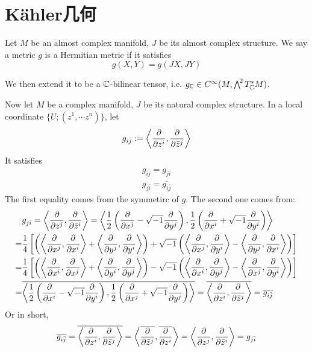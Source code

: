     \section{K\"ahler几何}
    \begin{definition}
        Let $M$ be an almost complex manifold, $J$ be its almost complex structure. We say a metric $g$ is a Hermitian metric if it satisfies
        \[
            g(X,Y)=g(JX,JY)
        \]
    \end{definition}
    We then extend it to be a $\mathbb{C}$-bilinear tensor, i.e. $g_{\mathbb{C}}\in C^{\infty}(M,\bigwedge^{\!2}T^*_{\mathbb{C}}M)$. 

    Now let $M$ be a complex manifold, $J$ be its natural complex structure. In a local coordinate $\{U;(z^1,\cdots z^n)\}$, let
    \[
        g_{i\bar{j}}:=\left\langle \frac{\partial }{\partial z^i},\frac{\partial }{\partial \bar{z}^j}\right\rangle 
    \]
    It satisfies
    \begin{gather*}
        g_{i\bar{j}}=g_{\bar{j}i} \\
        g_{j\bar{i}}=\overline{g_{i\bar{j}}}
    \end{gather*}
    The first equality comes from the symmetirc of $g$. The second one comes from:
    \begin{align*}
    &g_{j\bar{i}} = \left\langle\frac{\partial }{\partial z^j},\frac{\partial }{\partial \bar{z}^i}\right\rangle = \left\langle\frac{1}{2}\left(\frac{\partial }{\partial x^j}-\sqrt{-1}\frac{\partial }{\partial y^j}\right), \frac{1}{2}\left(\frac{\partial }{\partial x^i}+\sqrt{-1}\frac{\partial }{\partial y^i}\right)\right\rangle \\
    =& \frac{1}{4} \left[\left(\left\langle\frac{\partial }{\partial x^j},\frac{\partial }{\partial x^i}\right\rangle+\left\langle\frac{\partial }{\partial y^j},\frac{\partial }{\partial y^i}\right\rangle\right)+\sqrt{-1}\left(\left\langle\frac{\partial }{\partial x^j},\frac{\partial }{\partial y^i}\right\rangle-\left\langle\frac{\partial }{\partial y^j},\frac{\partial }{\partial x^i}\right\rangle\right)\right] \\
    =& \frac{1}{4} \left[\left(\left\langle\frac{\partial }{\partial x^i},\frac{\partial }{\partial x^j}\right\rangle+\left\langle\frac{\partial }{\partial y^i},\frac{\partial }{\partial y^j}\right\rangle\right)-\sqrt{-1}\left(\left\langle\frac{\partial }{\partial x^i},\frac{\partial }{\partial y^j}\right\rangle-\left\langle\frac{\partial }{\partial x^j},\frac{\partial }{\partial y^i}\right\rangle\right)\right] \\
    =& \overline{\left\langle\frac{1}{2}\left(\frac{\partial }{\partial x^i}-\sqrt{-1}\frac{\partial }{\partial y^i}\right), \frac{1}{2}\left(\frac{\partial }{\partial x^j}+\sqrt{-1}\frac{\partial }{\partial y^j}\right)\right\rangle} = \overline{\left\langle\frac{\partial }{\partial z^i},\frac{\partial }{\partial \bar{z}^j}\right\rangle} = \overline{g_{i\bar{j}}}
    \end{align*}
    Or in short, 
    \begin{equation*}
        \overline{g_{i\bar{j}}} = \overline{\left\langle\frac{\partial }{\partial z^i},\frac{\partial }{\partial \bar{z}^j}\right\rangle} = \left\langle\overline{\frac{\partial }{\partial \bar{z}^j}},\overline{\frac{\partial }{\partial z^i}}\right\rangle = \left\langle\frac{\partial }{\partial z^j},\frac{\partial }{\partial \bar{z}^i}\right\rangle = g_{j\bar{i}} 
    \end{equation*}

